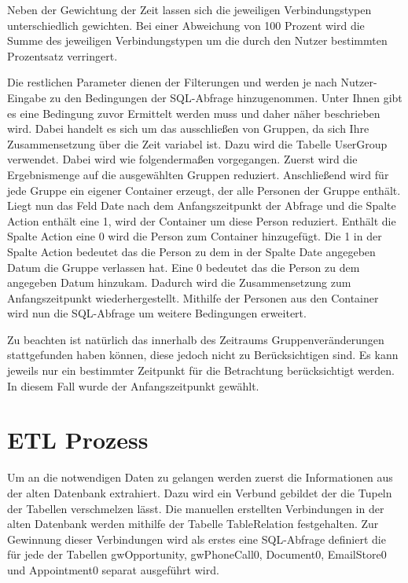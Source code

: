 Neben der Gewichtung der Zeit lassen sich die jeweiligen Verbindungstypen unterschiedlich gewichten. Bei einer Abweichung von 100 Prozent wird die Summe des jeweiligen Verbindungstypen um die durch den Nutzer bestimmten Prozentsatz verringert. 

Die restlichen Parameter dienen der Filterungen und werden je nach Nutzer-Eingabe zu den Bedingungen der SQL-Abfrage hinzugenommen. Unter Ihnen gibt es eine Bedingung zuvor Ermittelt werden muss und daher näher beschrieben wird. Dabei handelt es sich um das ausschließen von Gruppen, da sich Ihre Zusammensetzung über die Zeit variabel ist. Dazu wird die Tabelle UserGroup verwendet. Dabei wird wie folgendermaßen vorgegangen. Zuerst wird die Ergebnismenge auf die ausgewählten Gruppen reduziert. Anschließend wird für jede Gruppe ein eigener Container erzeugt, der alle Personen der Gruppe enthält. Liegt nun das Feld Date nach dem Anfangszeitpunkt der Abfrage und die Spalte Action enthält eine 1, wird der Container um diese Person reduziert. Enthält die Spalte Action eine 0 wird die Person zum Container hinzugefügt. Die 1 in der Spalte Action bedeutet das die Person zu dem in der Spalte Date angegeben Datum die Gruppe verlassen hat. Eine 0 bedeutet das die Person zu dem angegeben Datum hinzukam. Dadurch wird die Zusammensetzung zum Anfangszeitpunkt wiederhergestellt. Mithilfe der Personen aus den Container wird nun die SQL-Abfrage um weitere Bedingungen erweitert.

Zu beachten ist natürlich das innerhalb des Zeitraums Gruppenveränderungen stattgefunden haben können, diese jedoch nicht zu Berücksichtigen sind. Es kann jeweils nur ein bestimmter Zeitpunkt für die Betrachtung berücksichtigt werden. In diesem Fall wurde der Anfangszeitpunkt gewählt.

\section{ETL Prozess}

Um an die notwendigen Daten zu gelangen werden zuerst die Informationen aus der alten Datenbank extrahiert. Dazu wird ein Verbund gebildet der die Tupeln der Tabellen verschmelzen lässt. Die manuellen erstellten Verbindungen in der alten Datenbank werden mithilfe der Tabelle TableRelation festgehalten. Zur Gewinnung dieser Verbindungen wird als erstes eine SQL-Abfrage definiert die für jede der Tabellen gwOpportunity, gwPhoneCall0, Document0, EmailStore0 und Appointment0 separat ausgeführt wird. 

